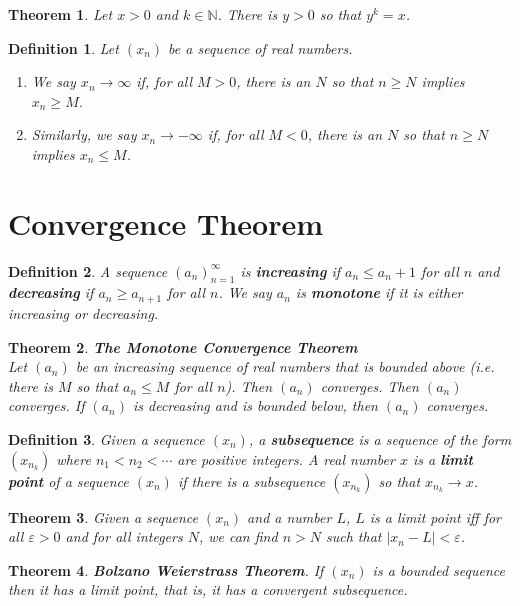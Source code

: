 \documentclass{article}
\theoremstyle{sltheorem}
\newtheorem{definition}{Definition}[section]
\newtheorem{theorem}{Theorem}[section]
\newcommand{\N}{\mathbb{N}}
\newcommand*\B[1]{\textbf{#1}}
\begin{document}
\begin{theorem}
    Let $x>0$ and $k\in\N$. There is $y>0$ so that $y^k=x$.
\end{theorem}
\begin{definition}
    Let $(x_n)$ be a sequence of real numbers.
    \begin{enumerate}
        \item We say $x_n\to \infty$ if, for all $M>0$, there is an $N$ so that $n\geq N$ implies $x_n\geq M$.
        \item Similarly, we say $x_n\to-\infty$ if, for all $M<0$, there is an $N$ so that $n\geq N$ implies $x_n\leq M$.
    \end{enumerate}
\end{definition}
\section{Convergence Theorem}
\begin{definition}
    A sequence $(a_n)^\infty_{n=1}$ is \B{increasing} if $a_n\leq a_n+1$ for all $n$ and \B{decreasing} if $a_n\geq a_{n+1}$ for all $n$. We say $a_n$ is \B{monotone} if it is either increasing or decreasing.
\end{definition}
\begin{theorem}
    \B{The Monotone Convergence Theorem}\\
    Let $(a_n)$ be an increasing sequence of real numbers that is bounded above (i.e. there is $M$ so that $a_n\leq M$ for all $n$). Then $(a_n)$ converges. Then $(a_n)$ converges. If $(a_n)$ is decreasing and is bounded below, then $(a_n)$ converges.
\end{theorem}
\begin{definition}
    Given a sequence $(x_n)$, a \B{subsequence} is a sequence of the form $(x_{n_k})$ where $n_1<n_2<\cdots$ are positive integers.
    A real number $x$ is a \B{limit point} of a sequence $(x_n)$ if there is a subsequence $(x_{n_k})$ so that $x_{n_k}\to x$.
\end{definition}
\begin{theorem}
    Given a sequence $(x_n)$ and a number $L$, $L$ is a limit point iff for all $\varepsilon > 0$ and for all integers $N$, we can find $n>N$ such that $|x_n-L|<\varepsilon$.
\end{theorem}
\begin{theorem}
    \B{Bolzano Weierstrass Theorem}. If $(x_n)$ is a bounded sequence then it has a limit point, that is, it has a convergent subsequence.
\end{theorem}
\end{document}
